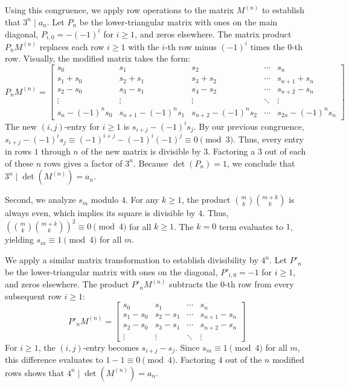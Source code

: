 Using this congruence, we apply row operations to the matrix $M^{(n)}$ to establish that $3^n \mid a_n$. Let $P_n$ be the lower-triangular matrix with ones on the main diagonal, $P_{i,0} = -(-1)^i$ for $i \ge 1$, and zeros elsewhere. The matrix product $P_n M^{(n)}$ replaces each row $i \ge 1$ with the $i$-th row minus $(-1)^i$ times the $0$-th row. Visually, the modified matrix takes the form:
$$ P_n M^{(n)} = \begin{bmatrix} s_0 & s_1 & s_2 & \cdots & s_n \\ s_1 + s_0 & s_2 + s_1 & s_3 + s_2 & \cdots & s_{n+1} + s_n \\ s_2 - s_0 & s_3 - s_1 & s_4 - s_2 & \cdots & s_{n+2} - s_n \\ \vdots & \vdots & \vdots & \ddots & \vdots \\ s_n - (-1)^n s_0 & s_{n+1} - (-1)^n s_1 & s_{n+2} - (-1)^n s_2 & \cdots & s_{2n} - (-1)^n s_n \end{bmatrix} $$
The new $(i, j)$-entry for $i \ge 1$ is $s_{i+j} - (-1)^i s_j$. By our previous congruence, $s_{i+j} - (-1)^i s_j \equiv (-1)^{i+j} - (-1)^i(-1)^j \equiv 0 \pmod 3$. Thus, every entry in rows $1$ through $n$ of the new matrix is divisible by $3$. Factoring a $3$ out of each of these $n$ rows gives a factor of $3^n$. Because $\det(P_n) = 1$, we conclude that $3^n \mid \det(M^{(n)}) = a_n$.

Second, we analyze $s_m$ modulo $4$. For any $k \ge 1$, the product $\binom{m}{k} \binom{m+k}{k}$ is always even, which implies its square is divisible by $4$. Thus, $\left(\binom{m}{k} \binom{m+k}{k}\right)^2 \equiv 0 \pmod 4$ for all $k \ge 1$. The $k=0$ term evaluates to $1$, yielding $s_m \equiv 1 \pmod 4$ for all $m$. 

We apply a similar matrix transformation to establish divisibility by $4^n$. Let $P'_n$ be the lower-triangular matrix with ones on the diagonal, $P'_{i,0} = -1$ for $i \ge 1$, and zeros elsewhere. The product $P'_n M^{(n)}$ subtracts the $0$-th row from every subsequent row $i \ge 1$:
$$ P'_n M^{(n)} = \begin{bmatrix} s_0 & s_1 & \cdots & s_n \\ s_1 - s_0 & s_2 - s_1 & \cdots & s_{n+1} - s_n \\ s_2 - s_0 & s_3 - s_1 & \cdots & s_{n+2} - s_n \\ \vdots & \vdots & \ddots & \vdots \end{bmatrix} $$
For $i \ge 1$, the $(i, j)$-entry becomes $s_{i+j} - s_j$. Since $s_m \equiv 1 \pmod 4$ for all $m$, this difference evaluates to $1 - 1 \equiv 0 \pmod 4$. Factoring $4$ out of the $n$ modified rows shows that $4^n \mid \det(M^{(n)}) = a_n$.


